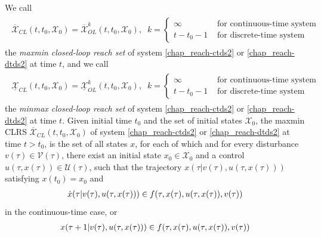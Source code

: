 \documentclass[letterpaper,10pt,english]{sphinxmanual}
\begin{document}
We call
\label{chap_reach:equation-maxminclrs}\begin{gather}
\begin{split}\overline{{\mathcal X}}_{CL}(t, t_0, {\mathcal X}_0) = \overline{{\mathcal X}}_{OL}^k(t, t_0, {\mathcal X}_0), \;\;
k = \left\{\begin{array}{ll}
\infty & \mbox{ for continuous-time system}\\
t-t_0-1 & \mbox{ for discrete-time system}\end{array}\right.\end{split}\label{chap_reach-maxminclrs}
\end{gather}
the \emph{maxmin closed-loop reach set} of system \eqref{chap_reach-ctds2} or \eqref{chap_reach-dtds2} at
time $t$, and we call
\label{chap_reach:equation-minmaxclrs}\begin{gather}
\begin{split}\underline{{\mathcal X}}_{CL}(t, t_0, {\mathcal X}_0) = \underline{{\mathcal X}}_{OL}^k(t, t_0, {\mathcal X}_0), \;\;
k = \left\{\begin{array}{ll}
\infty & \mbox{ for continuous-time system}\\
t-t_0-1 & \mbox{ for discrete-time system}\end{array}\right.\end{split}\label{chap_reach-minmaxclrs}
\end{gather}
the \emph{minmax closed-loop reach set} of system \eqref{chap_reach-ctds2} or \eqref{chap_reach-dtds2} at
time $t$.
Given initial time $t_0$ and the set of initial
states ${\mathcal X}_0$, the maxmin CLRS
$\overline{{\mathcal X}}_{CL}(t, t_0, {\mathcal X}_0)$ of system
\eqref{chap_reach-ctds2} or \eqref{chap_reach-dtds2} at time $t>t_0$, is the set of all states
$x$, for each of which and for every disturbance
$v(\tau)\in{\mathcal V}(\tau)$, there exist an initial state
$x_0\in{\mathcal X}_0$ and a control
$u(\tau, x(\tau))\in{\mathcal U}(\tau)$, such that the trajectory
$x(\tau | v(\tau), u(\tau, x(\tau)))$ satisfying
$x(t_0) = x_0$ and
\begin{gather}
\begin{split}\dot{x}(\tau | v(\tau), u(\tau, x(\tau))) \in
f(\tau, x(\tau), u(\tau, x(\tau)), v(\tau))\end{split}\notag
\end{gather}
in the continuous-time case, or
\begin{gather}
\begin{split}x(\tau+1 | v(\tau), u(\tau, x(\tau))) \in
f(\tau, x(\tau), u(\tau, x(\tau)), v(\tau))\end{split}\notag
\end{gather}
\end{document}
